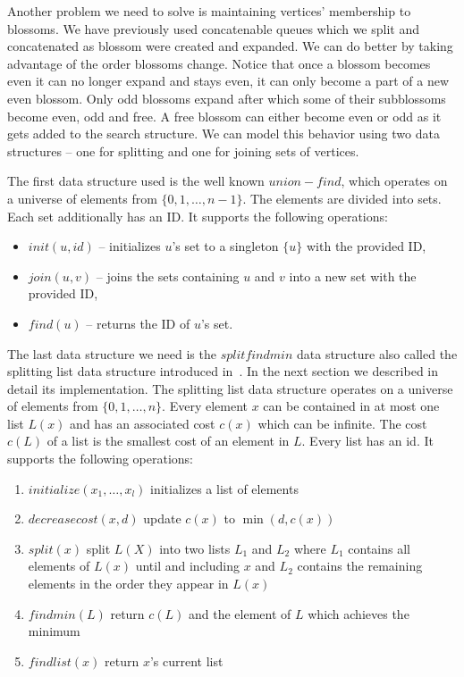 Another problem we need to solve is maintaining vertices' membership to blossoms. We have previously used concatenable queues which we split and concatenated as blossom were created and expanded. We can do better by taking advantage of the order blossoms change. Notice that once a blossom becomes even it can no longer expand and stays even, it can only become a part of a new even blossom. Only odd blossoms expand after which some of their subblossoms become even, odd and free. A free blossom can either become even or odd as it gets added to the search structure. We can model this behavior using two data structures – one for splitting and one for joining sets of vertices.

The first data structure used is the well known $union-find$, which operates on a universe of elements from $\{ 0, 1, \dots, n-1 \}$. The elements are divided into sets. Each set additionally has an ID\@. It supports the following operations:

\begin{itemize}
    \item $init(u, id)$ – initializes $u$'s set to a singleton $\{u\}$ with the provided ID,
    \item $join(u, v)$ – joins the sets containing $u$ and $v$ into a new set with the provided ID,
    \item $find(u)$ – returns the ID of $u$'s set.
\end{itemize}

The last data structure we need is the $splitfindmin$ data structure also called the splitting list data structure introduced in~\cite{gabow1985scaling}. In the next section we described in detail its implementation. The splitting list data structure operates on a universe of elements from $\{0, 1, \dots, n\}$. Every element $x$ can be contained in at most one list $L(x)$ and has an associated cost $c(x)$ which can be infinite. The cost $c(L)$ of a list is the smallest cost of an element in $L$. Every list has an id. It supports the following operations:

\begin{enumerate}
    \item $initialize(x_1, \dots, x_l)$ initializes a list of elements
    \item $decreasecost(x, d)$ update $c(x)$ to $\min(d, c(x))$
    \item $split(x)$ split $L(X)$ into two lists $L_1$ and $L_2$ where $L_1$ contains all elements of $L(x)$ until and including $x$ and $L_2$ contains the remaining elements in the order they appear in $L(x)$
    \item $findmin(L)$ return $c(L)$ and the element of $L$ which achieves the minimum
    \item $findlist(x)$ return $x$'s current list
\end{enumerate}

